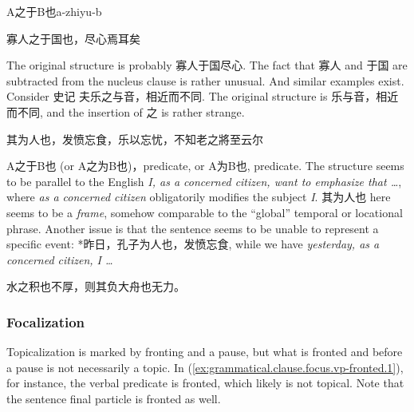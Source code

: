 \documentclass[UTF8, a4paper, oneside, scheme=plain, 12pt]{ctexrep}
\newcommand{\form}[1]{\emph{#1}}
\begin{document}
\begin{todobox}{A之于B也}{a-zhiyu-b}
    \begin{exe}
        \ex 寡人之于国也，尽心焉耳矣
    \end{exe}
    The original structure is probably 寡人于国尽心.
    The fact that 寡人 and 于国 are subtracted from the nucleus clause is rather unusual.
    And similar examples exist.
    Consider 史记 夫乐之与音，相近而不同.
    The original structure is 乐与音，相近而不同,
    and the insertion of 之 is rather strange.

    \begin{exe}
        \ex 其为人也，发愤忘食，乐以忘忧，不知老之將至云尔
    \end{exe}

    A之于B也 (or A之为B也)，predicate, or A为B也, predicate.
    The structure seems to be parallel to the English
    \form{I, as a concerned citizen, want to emphasize that \dots},
    where \form{as a concerned citizen} obligatorily modifies the subject \form{I}.
    其为人也 here seems to be a \emph{frame}, somehow comparable to the ``global'' temporal or locational phrase.
    Another issue is that the sentence seems to be unable to represent a specific event:
    *昨日，孔子为人也，发愤忘食, while we have \form{yesterday, as a concerned citizen, I \dots}
    
    \begin{exe}
        \ex 水之积也不厚，则其负大舟也无力。
    \end{exe}

\end{todobox}

\subsubsection{Focalization}

Topicalization is marked by fronting and a pause,
but what is fronted and before a pause is not necessarily a topic.
In (\ref{ex:grammatical.clause.focus.vp-fronted.1}),
for instance, the verbal predicate is fronted,
which likely is not topical.
Note that the sentence final particle is fronted as well.
\end{document}
